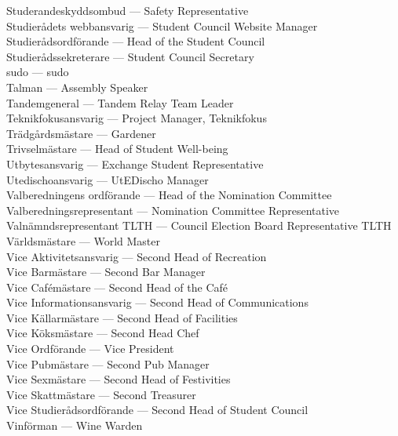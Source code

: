 \documentclass{dsekkallelse}
\begin{document}
Studerandeskyddsombud ---	Safety Representative\\
Studierådets webbansvarig ---	Student Council Website Manager\\
Studierådsordförande ---	Head of the Student Council\\
Studierådssekreterare ---	Student Council Secretary\\
sudo ---	sudo\\
Talman ---	Assembly Speaker\\
Tandemgeneral ---	Tandem Relay Team Leader\\
Teknikfokusansvarig ---	Project Manager, Teknikfokus\\
Trädgårdsmästare ---	Gardener\\
Trivselmästare ---	Head of Student Well-being\\
Utbytesansvarig ---	Exchange Student Representative\\
Utedischoansvarig ---	UtEDischo Manager\\
Valberedningens ordförande ---	Head of the Nomination Committee\\
Valberedningsrepresentant ---	Nomination Committee Representative\\
Valnämndsrepresentant TLTH ---	Council Election Board Representative TLTH\\
Världsmästare ---	World Master\\
Vice Aktivitetsansvarig --- Second Head of Recreation\\
Vice Barmästare ---	Second Bar Manager\\
Vice Cafémästare ---	Second Head of the Café\\
Vice Informationsansvarig ---	Second Head of Communications\\
Vice Källarmästare ---	Second Head of Facilities\\
Vice Köksmästare ---	Second Head Chef\\
Vice Ordförande ---	Vice President\\
Vice Pubmästare ---	Second Pub Manager\\
Vice Sexmästare ---	Second Head of Festivities\\
Vice Skattmästare ---	Second Treasurer\\
Vice Studierådsordförande ---	Second Head of Student Council\\
Vinförman ---	Wine Warden\\
\end{document}
